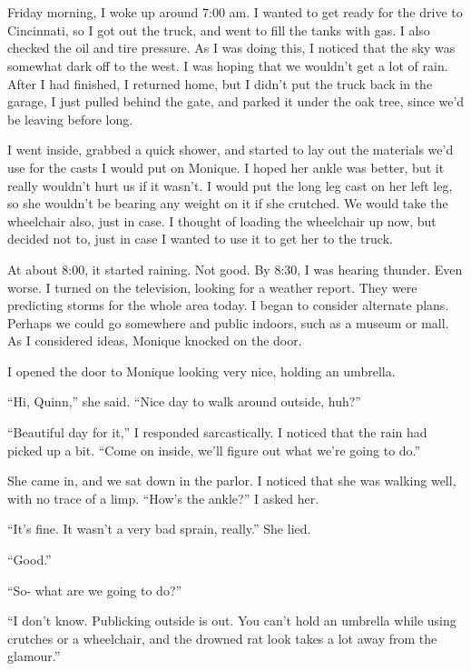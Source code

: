 \chapter{}
Friday morning, I woke up around 7:00 am. I wanted to get ready for the drive to Cincinnati,
so I got out the truck, and went to fill the tanks with gas. I also checked the oil and tire
pressure. As I was doing this, I noticed that the sky was somewhat dark off to the west. I was
hoping that we wouldn't get a lot of rain. After I had finished, I returned home, but I didn't
put the truck back in the garage, I just pulled behind the gate, and parked it under the oak
tree, since we'd be leaving before long.

I went inside, grabbed a quick shower, and started to lay out the materials we'd use for
the casts I would put on Monique. I hoped her ankle was better, but it really wouldn't hurt us
if it wasn't. I would put the long leg cast on her left leg, so she wouldn't be bearing any
weight on it if she crutched. We would take the wheelchair also, just in case. I thought of
loading the wheelchair up now, but decided not to, just in case I wanted to use it to get her to
the truck.

At about 8:00, it started raining. Not good. By 8:30, I was hearing thunder. Even worse. I
turned on the television, looking for a weather report. They were predicting storms for the
whole area today. I began to consider alternate plans. Perhaps we could go somewhere and public
indoors, such as a museum or mall. As I considered ideas, Monique knocked on the door.

I opened the door to Monique looking very nice, holding an umbrella.

``Hi, Quinn,'' she said. ``Nice day to walk around outside, huh?''

``Beautiful day for it,'' I responded sarcastically. I noticed that the rain had picked up
a bit. ``Come on inside, we'll figure out what we're going to do.''

She came in, and we sat down in the parlor. I noticed that she was walking well, with no
trace of a limp. ``How's the ankle?'' I asked her.

``It's fine. It wasn't a very bad sprain, really.'' She lied.

``Good.''

``So- what are we going to do?''

``I don't know. Publicking outside is out. You can't hold an umbrella while using crutches
or a wheelchair, and the drowned rat look takes a lot away from the glamour.''

